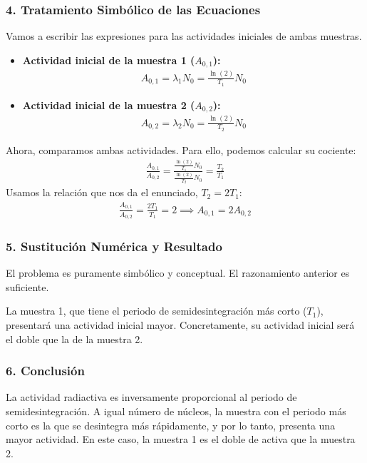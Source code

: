 \subsubsection*{4. Tratamiento Simbólico de las Ecuaciones}
Vamos a escribir las expresiones para las actividades iniciales de ambas muestras.
\begin{itemize}
    \item \textbf{Actividad inicial de la muestra 1 ($A_{0,1}$):}
    \begin{gather}
        A_{0,1} = \lambda_1 N_0 = \frac{\ln(2)}{T_1} N_0
    \end{gather}
    \item \textbf{Actividad inicial de la muestra 2 ($A_{0,2}$):}
    \begin{gather}
        A_{0,2} = \lambda_2 N_0 = \frac{\ln(2)}{T_2} N_0
    \end{gather}
\end{itemize}
Ahora, comparamos ambas actividades. Para ello, podemos calcular su cociente:
\begin{gather}
    \frac{A_{0,1}}{A_{0,2}} = \frac{\frac{\ln(2)}{T_1} N_0}{\frac{\ln(2)}{T_2} N_0} = \frac{T_2}{T_1}
\end{gather}
Usamos la relación que nos da el enunciado, $T_2 = 2T_1$:
\begin{gather}
    \frac{A_{0,1}}{A_{0,2}} = \frac{2T_1}{T_1} = 2 \implies A_{0,1} = 2 A_{0,2}
\end{gather}

\subsubsection*{5. Sustitución Numérica y Resultado}
El problema es puramente simbólico y conceptual. El razonamiento anterior es suficiente.
\begin{cajaresultado}
    La muestra 1, que tiene el periodo de semidesintegración más corto ($T_1$), presentará una actividad inicial mayor. Concretamente, su actividad inicial será el doble que la de la muestra 2.
\end{cajaresultado}

\subsubsection*{6. Conclusión}
\begin{cajaconclusion}
La actividad radiactiva es inversamente proporcional al periodo de semidesintegración. A igual número de núcleos, la muestra con el periodo más corto es la que se desintegra más rápidamente, y por lo tanto, presenta una mayor actividad. En este caso, la muestra 1 es el doble de activa que la muestra 2.
\end{cajaconclusion}

\newpage
